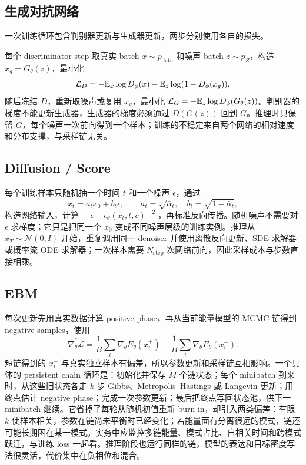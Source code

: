 \subsection{生成对抗网络}

一次训练循环包含判别器更新与生成器更新，两步分别使用各自的损失。

每个 discriminator step 取真实 batch \(x\sim p_{\mathrm{data}}\) 和噪声 batch \(z\sim p_Z\)，构造 \(x_g=G_\theta(z)\)，最小化
\begin{equation}
\mathcal L_D=-\mathbb{E}_x\log D_\phi(x)-\mathbb{E}_z\log(1-D_\phi(x_g)).
\end{equation}
随后冻结 \(D\)，重新取噪声或复用 \(x_g\)，最小化
\(\mathcal L_G=-\mathbb{E}_z\log D_\phi(G_\theta(z))\)。判别器的梯度不能更新生成器，生成器的梯度必须通过 \(D(G(z))\) 回到 \(G\)。推理时只保留 \(G\)，每个噪声一次前向得到一个样本；训练的不稳定来自两个网络的相对速度和分布支撑，与采样链无关。

\subsection{Diffusion / Score}

每个训练样本只随机抽一个时间 \(t\) 和一个噪声 \(\epsilon\)，通过
\begin{equation}
x_t=a_tx_0+b_t\epsilon,\qquad a_t=\sqrt{\bar\alpha_t},\quad b_t=\sqrt{1-\bar\alpha_t},
\end{equation}
构造网络输入，计算 \(\|\epsilon-\epsilon_\theta(x_t,t,c)\|^2\)，再标准反向传播。随机噪声不需要对 \(\epsilon\) 求梯度；它只是把同一个 \(x_0\) 变成不同噪声层级的训练实例。推理从 \(x_T\sim\mathcal N(0,I)\) 开始，重复调用同一 denoiser 并使用离散反向更新、SDE 求解器或概率流 ODE 求解器；一次样本需要 \(N_{\mathrm{step}}\) 次网络前向，因此采样成本与步数直接相乘。

\subsection{EBM}

每次更新先用真实数据计算 positive phase，再从当前能量模型的 MCMC 链得到 negative samples，使用
\begin{equation}
\widehat{\nabla_\theta\mathcal L}
=\frac1B\sum_i\nabla_\theta E_\theta(x_i^{+})
-\frac1B\sum_i\nabla_\theta E_\theta(x_i^{-}).
\end{equation}
短链得到的 \(x_i^{-}\) 与真实独立样本有偏差，所以参数更新和采样链互相影响。一个具体的 persistent chain 循环是：初始化并保存 \(M\) 个链状态；每个 minibatch 到来时，从这些旧状态各走 \(k\) 步 Gibbs、Metropolis--Hastings 或 Langevin 更新；用终点估计 negative phase；完成一次参数更新；最后把终点写回状态池，供下一 minibatch 继续。它省掉了每轮从随机初值重新 burn-in，却引入两类偏差：有限 \(k\) 使样本相关，参数在链尚未平衡时已经变化；若能量面有分离很远的模式，链还可能长期困在某一模式。实务中应监控多链能量、模式占比、自相关时间和跨模式跃迁，与训练 loss 一起看。推理阶段也运行同样的链，模型的表达和目标密度写法很灵活，代价集中在负相位和混合。

